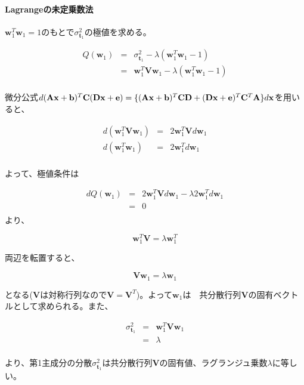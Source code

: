 \paragraph{Lagrangeの未定乗数法}
\({\mathbf w}^T_1{\mathbf w}_1=1\)のもとで\(\sigma^2_{\mathbf t_1}\)の極値を求める。

\begin{eqnarray*}
Q({\mathbf w}_1) & = & \sigma^2_{\mathbf t_1} - \lambda ({\mathbf w}^T_1{\mathbf w}_1 - 1)\\
& = &  {\mathbf w}^T_1{\mathbf V}{\mathbf w}_1 - \lambda ({\mathbf w}^T_1{\mathbf w}_1 - 1)\\
\end{eqnarray*}

微分公式\(d ({\bf Ax + b})^T {\mathbf C} ({\bf Dx + e}) = \{({\bf Ax + b})^T {\bf CD} +({\bf Dx + e})^T{\mathbf C}^T{\mathbf A}\}d{\mathbf x}\)を用いると、

\begin{eqnarray*}
d({\mathbf w}^T_1{\mathbf V}{\mathbf w}_1) & = & 2 {\mathbf w}_1^T {\mathbf V} d{\mathbf w}_1\\
d({\mathbf w}^T_1{\mathbf w}_1) & = & 2 {\mathbf w}_1^T d{\mathbf w}_1\\
\end{eqnarray*}

よって、極値条件は

\begin{eqnarray*}
dQ({\mathbf w}_1) & = & 2 {\mathbf w}_1^T {\mathbf V} d{\mathbf w}_1 - \lambda 2 {\mathbf w}_1^T d{\mathbf w}_1 \\
                  & = & 0 \\
\end{eqnarray*}
より、

\[{\mathbf w}_1^T {\mathbf V} = \lambda {\mathbf w}_1^T \]

両辺を転置すると、

\[ {\mathbf V}{\mathbf w}_1 = \lambda {\mathbf w}_1 \]

となる({\bf V}は対称行列なので\({\mathbf V} = {\mathbf V}^T\))。よって\({\mathbf w}_1\)は　共分散行列\({\mathbf V}\)の固有ベクトルとして求められる。また、

\begin{eqnarray*}
\sigma^2_{\mathbf t_1} & = & {\mathbf w}_1^T {\mathbf V} {\mathbf w}_1\\
 & = & \lambda \\
\end{eqnarray*}

より、第1主成分の分散\(\sigma^2_{\mathbf t_1}\)は共分散行列\({\mathbf V}\)の固有値、ラグランジュ乗数\(\lambda\)に等しい。

